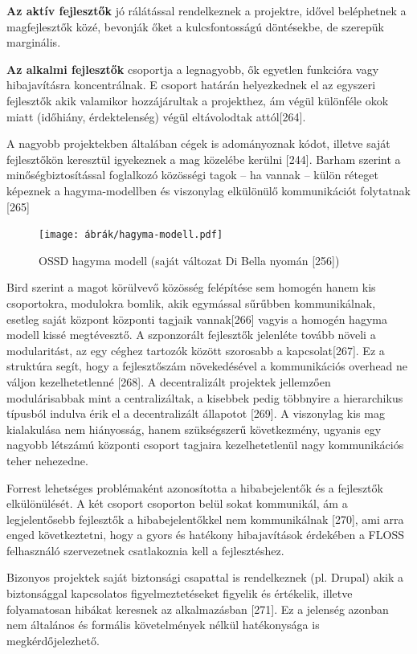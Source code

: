 \documentclass[12pt,magyar,a4paper,oneside]{scrreprt}
\begin{document}
\textbf{Az aktív fejlesztők} jó rálátással rendelkeznek a projektre,
idővel beléphetnek a magfejlesztők közé, bevonják őket a kulcsfontosságú
döntésekbe, de szerepük marginális.

\textbf{Az alkalmi fejlesztők} csoportja a legnagyobb, ők egyetlen
funkcióra vagy hibajavításra koncentrálnak. E csoport határán
helyezkednek el az egyszeri fejlesztők akik valamikor hozzájárultak a
projekthez, ám végül különféle okok miatt (időhiány, érdektelenség)
végül eltávolodtak attól{[}264{]}.

A nagyobb projektekben általában cégek is adományoznak kódot, illetve
saját fejlesztőkön keresztül igyekeznek a mag közelébe kerülni
{[}244{]}. Barham szerint a minőségbiztosítással foglalkozó közösségi
tagok -- ha vannak -- külön réteget képeznek a hagyma-modellben és
viszonylag elkülönülő kommunikációt folytatnak {[}265{]}

\begin{figure}
\hypertarget{fig:HagymaModell}{%
\centering
\texttt{[image: ábrák/hagyma-modell.pdf]}
\caption{OSSD hagyma modell (saját változat Di Bella nyomán
{[}256{]})}\label{fig:HagymaModell}
}
\end{figure}

Bird szerint a magot körülvevő közösség felépítése sem homogén hanem kis
csoportokra, modulokra bomlik, akik egymással sűrűbben kommunikálnak,
esetleg saját központ központi tagjaik vannak{[}266{]} vagyis a homogén
hagyma modell kissé megtévesztő. A szponzorált fejlesztők jelenléte
tovább növeli a modularitást, az egy céghez tartozók között szorosabb a
kapcsolat{[}267{]}. Ez a struktúra segít, hogy a fejlesztőszám
növekedésével a kommunikációs overhead ne váljon kezelhetetlenné
{[}268{]}. A decentralizált projektek jellemzően modulárisabbak mint a
centralizáltak, a kisebbek pedig többnyire a hierarchikus típusból
indulva érik el a decentralizált állapotot {[}269{]}. A viszonylag kis
mag kialakulása nem hiányosság, hanem szükségszerű következmény, ugyanis
egy nagyobb létszámú központi csoport tagjaira kezelhetetlenül nagy
kommunikációs teher nehezedne.

Forrest lehetséges problémaként azonosította a hibabejelentők és a
fejlesztők elkülönülését. A két csoport csoporton belül sokat
kommunikál, ám a legjelentősebb fejlesztők a hibabejelentőkkel nem
kommunikálnak {[}270{]}, ami arra enged következtetni, hogy a gyors és
hatékony hibajavítások érdekében a FLOSS felhasználó szervezetnek
csatlakoznia kell a fejlesztéshez.

Bizonyos projektek saját biztonsági csapattal is rendelkeznek (pl.
Drupal) akik a biztonsággal kapcsolatos figyelmeztetéseket figyelik és
értékelik, illetve folyamatosan hibákat keresnek az alkalmazásban
{[}271{]}. Ez a jelenség azonban nem általános és formális követelmények
nélkül hatékonysága is megkérdőjelezhető.
\end{document}
